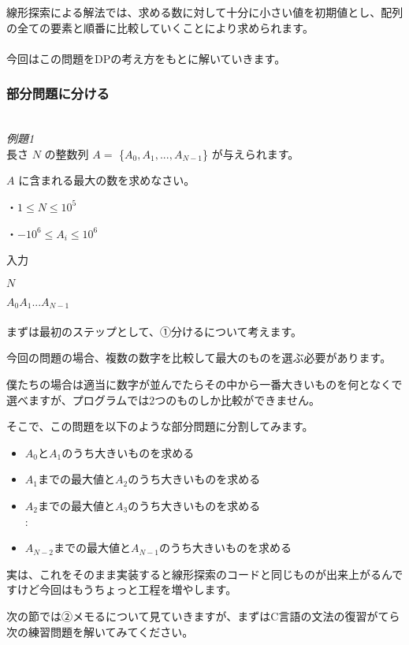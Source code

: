 \noindent
線形探索による解法では、求める数に対して十分に小さい値を初期値とし、配列の全ての要素と順番に比較していくことにより求められます。
\\ \\
\noindent
今回はこの問題をDPの考え方をもとに解いていきます。

\clearpage

\subsubsection{部分問題に分ける}
\hrulefill \\
\emph{例題1} \\
長さ $N$ の整数列 $A=$ \{$A_0,A_1,...,A_{N-1}$\} が与えられます。

\noindent
$A$ に含まれる最大の数を求めなさい。

\noindent
・$1 \leq N \leq 10^5$

\noindent
・$-10^6 \leq A_i \leq 10^6$

\noindent
入力

\noindent
$N$

\noindent
$A_0 A_1 ... A_{N-1}$\\
\hrulefill \\

\noindent
まずは最初のステップとして、①分けるについて考えます。

\noindent
今回の問題の場合、複数の数字を比較して最大のものを選ぶ必要があります。

\noindent
僕たちの場合は適当に数字が並んでたらその中から一番大きいものを何となくで選べますが、プログラムでは2つのものしか比較ができません。

\noindent
そこで、この問題を以下のような部分問題に分割してみます。

\begin{itemize}
    \item $A_0$と$A_1$のうち大きいものを求める
    \item $A_1$までの最大値と$A_2$のうち大きいものを求める
    \item $A_2$までの最大値と$A_3$のうち大きいものを求める \\:
    \item $A_{N-2}$までの最大値と$A_{N-1}$のうち大きいものを求める
\end{itemize}

\noindent
実は、これをそのまま実装すると線形探索のコードと同じものが出来上がるんですけど今回はもうちょっと工程を増やします。

\noindent
次の節では②メモるについて見ていきますが、まずはC言語の文法の復習がてら次の練習問題を解いてみてください。

